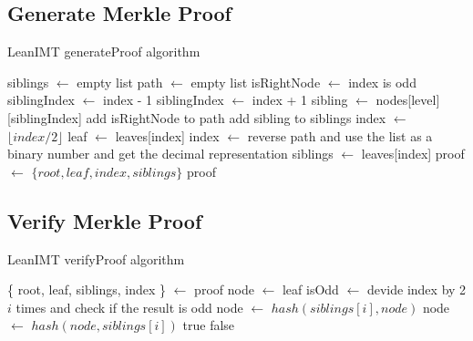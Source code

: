\documentclass{article}
\begin{document}
\bigbreak

\subsection{Generate Merkle Proof}

\bigbreak

\begin{algorithm}[H]
    \caption{LeanIMT generateProof algorithm}\label{generateProof}
    \begin{algorithmic}[1]
        \State siblings $\gets$ empty list
        \State path $\gets$ empty list
        \State isRightNode $\gets$ index is odd
         
        \State siblingIndex $\gets$ index - 1
        \Else {}
        \State siblingIndex $\gets$ index + 1
        \EndIf
        \State sibling $\gets$ nodes[level][siblingIndex]
        \State add isRightNode to path
        \State add sibling to siblings
        \EndIf
        \State index $\gets$ $\lfloor index/2 \rfloor$ 
        \EndFor
        \State leaf $\gets$ leaves[index]
        \State index $\gets$ reverse path and use the list as a binary number and get the decimal representation
        \State siblings $\gets$ leaves[index]
        \State proof $\gets$ $\{root, leaf , index, siblings \}$
        \State \Return proof
        \EndProcedure
    \end{algorithmic}
\end{algorithm}

\bigbreak

\subsection{Verify Merkle Proof}

\bigbreak

\begin{algorithm}[H]
    \caption{LeanIMT verifyProof algorithm}\label{verifyProof}
    \begin{algorithmic}[1]
        \State \{ root, leaf, siblings, index \} $\gets$ proof 
        \State node $\gets$ leaf
        \State isOdd $\gets$ devide index by 2 $i$ times and check if the result is odd
         
        \State node $\gets$ $hash(siblings[i], node)$
        \Else {}
        \State node $\gets$ $hash(node, siblings[i])$
        \EndIf
        \EndFor
        \State \Return true
        \Else
        \State \Return false
        \EndIf
        \EndProcedure
    \end{algorithmic}
\end{algorithm}
\end{document}

